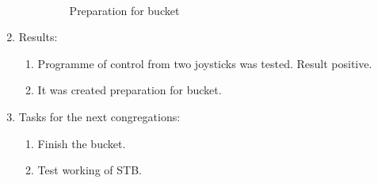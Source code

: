 \begin{enumerate}
\begin{enumerate}
	    \begin{figure}[H]
			\begin{minipage}[h]{0.2\linewidth}
				\center  
			\end{minipage}
			\begin{minipage}[h]{0.6\linewidth}
				\caption{Preparation for bucket}
			\end{minipage}
		\end{figure}
		
	\end{enumerate}
	
	\item Results:
	\begin{enumerate}
		\item Programme of control from two joysticks was tested. Result positive.
		
		\item It was created preparation for bucket.
		
	\end{enumerate}
	
	\item Tasks for the next congregations:
	\begin{enumerate}
		\item Finish the bucket.
		
		\item Test working of STB.
		
	\end{enumerate}     
\end{enumerate}
\fillpage

